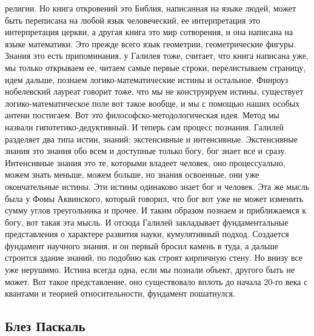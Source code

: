 \documentclass[a4paper, 12pt]{article}
\begin{document}
религии. Но книга откровений это Библия, написанная на языке людей, 
может быть переписана на любой язык человеческий, ее интерпретация это 
интерпретация церкви, а другая книга это мир сотворения, и она написана 
на языке математики. Это прежде всего язык геометрии, геометрические 
фигуры. Знания это есть припоминания, у Галилея тоже, считает, что книга 
написана уже, мы только открываем ее, читаем самые первые строки, 
перелистываем страницу, идем дальше, познаем логико-математические 
истины и остальное. Финроуз нобелевский лауреат говорит тоже, что мы не 
конструируем истины, существует логико-математическое поле вот такое 
вообще, и мы с помощью наших особых антенн постигаем. Вот это 
философско-методологическая идея. Метод мы назвали 
гипотетико-дедуктивный. И теперь сам процесс познания. Галилей разделяет 
два типа истин, знаний: экстенсивные и интенсивные. Экстенсивные знания 
это знания обо всем и доступные только богу, бог знает все и сразу. 
Интенсивные знания это те, которыми владеет человек, оно процессуально, 
можем знать меньше, можем больше, но знания освоенные, они уже 
окончательные истины. Эти истины одинаково знает бог и человек. Эта же 
мысль была у Фомы Аквинского, который говорил, что бог вот уже не может 
изменить сумму углов треугольника и прочее. И таким образом познаем 
и приближаемся к богу, вот такая эта мысль. И отсюда Галилей закладывает 
фундаментальные представления о характере развития науки, кумулятивный 
подход. Создается фундамент научного знания, и он первый бросил камень 
в туда, а дальше строится здание знаний, по подобию как строят кирпичную 
стену. Но внизу все уже нерушимо. Истина всегда одна, если мы познали 
объект, другого быть не может. Вот такое представление, оно существовало 
вплоть до начала 20-го века с квантами и теорией относительности, 
фундамент пошатнулся.


\subsection{Блез Паскаль}
\end{document}
